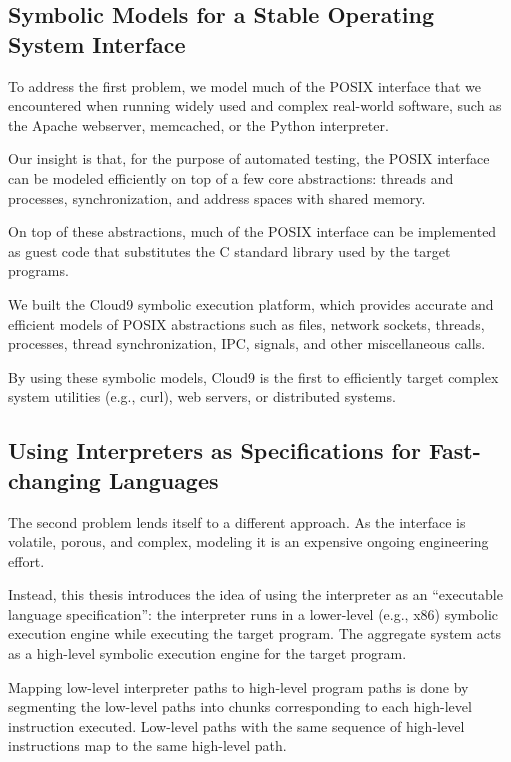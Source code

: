 \subsection{Symbolic Models for a Stable Operating System Interface}

To address the first problem, we model much of the POSIX interface that we encountered when running widely used and complex real-world software, such as the Apache webserver, memcached, or the Python interpreter.

Our insight is that, for the purpose of automated testing, the POSIX interface can be modeled efficiently on top of a few core abstractions: threads and processes, synchronization, and address spaces with shared memory.

On top of these abstractions, much of the POSIX interface can be implemented as guest code that substitutes the C standard library used by the target programs.

We built the Cloud9 symbolic execution platform, which provides accurate and efficient models of POSIX abstractions such as files, network sockets, threads, processes, thread synchronization, IPC, signals, and other miscellaneous calls.

By using these symbolic models, Cloud9 is the first to efficiently target complex system utilities (e.g., curl), web servers, or distributed systems.

\subsection{Using Interpreters as Specifications for Fast-changing Languages}

The second problem lends itself to a different approach.  As the interface is volatile, porous, and complex, modeling it is an expensive ongoing engineering effort.

Instead, this thesis introduces the idea of using the interpreter as an ``executable language specification'': the interpreter runs in a lower-level (e.g., x86) symbolic execution engine while executing the target program.  The aggregate system acts as a high-level symbolic execution engine for the target program.

Mapping low-level interpreter paths to high-level program paths is done by segmenting the low-level paths into chunks corresponding to each high-level instruction executed.  Low-level paths with the same sequence of high-level instructions map to the same high-level path.

